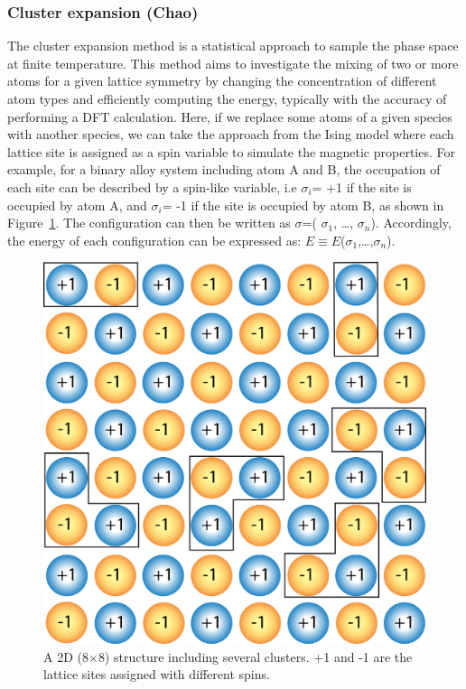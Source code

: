 \documentclass[../main.tex]{subfiles}
\begin{document}
\subsubsection{Cluster expansion (Chao)}
\label{sec:cluster_expansion}
The cluster expansion method is a statistical approach to sample the phase space at finite temperature.\cite{sanchez1984generalized,de1994cluster,blum2004mixed} This method aims to investigate the mixing of two or more atoms for a given lattice symmetry by changing the concentration of different atom types and efficiently computing the energy, typically with the accuracy of performing a DFT calculation. Here, if we replace some atoms of a given species with another species, we can take the approach from the Ising model \cite{gallavotti2013statistical} where each lattice site is assigned as a spin variable to simulate the magnetic properties.\cite{persson2010} For example, for a binary alloy system including atom A and B, the occupation of each site can be described by a spin-like variable, i.e $\sigma_i$= +1 if the site is occupied by atom A, and $\sigma_i$= -1 if the site is occupied by atom B, as shown in Figure~\ref{fig:cluster}. The configuration can then be written as $\sigma$=( $\sigma_1$, …, $\sigma_n$). Accordingly, the energy of each configuration can be expressed as: $E\equiv E$($\sigma_1$,…,$\sigma_n$).

\begin{figure}
    \centering
    \includegraphics[scale=0.5]{figures/clusters.png}
    \caption{A 2D (8$\times$8) structure including several clusters. +1 and -1 are the lattice sites assigned with different spins.}
    \label{fig:cluster}
\end{figure}
\end{document}
